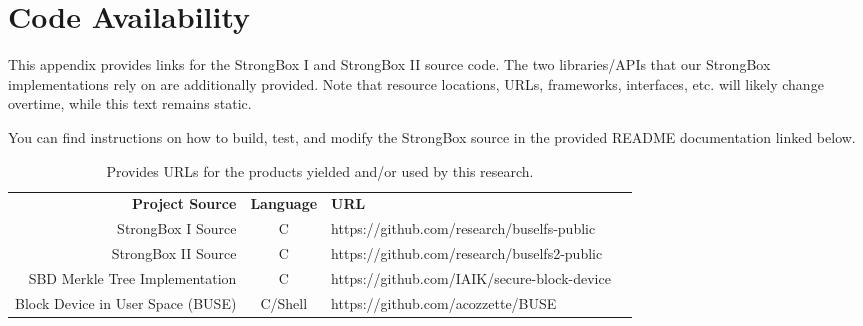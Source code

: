 \renewcommand\thechapter{A}
\chapter{Code Availability} \label{app:availability}

This appendix provides links for the StrongBox I and StrongBox II source code.
The two libraries/APIs that our StrongBox implementations rely on are
additionally provided. Note that resource locations, URLs, frameworks,
interfaces, etc. will likely change overtime, while this text remains static.

You can find instructions on how to build, test, and modify the StrongBox source
in the provided README documentation linked below.

\begin{table}
    \centering
    \caption{Provides URLs for the products yielded and/or used by this research.}
    \begin{tabular}{|r|c|l|l}
        \cline{1-3}
        \textbf{Project Source} & \textbf{Language} & \textbf{URL} & \\
        \cline{1-3}
        StrongBox I Source & C & https://github.com/research/buselfs-public & \\
        StrongBox II Source & C & https://github.com/research/buselfs2-public & \\
        SBD Merkle Tree Implementation & C & https://github.com/IAIK/secure-block-device & \\
        Block Device in User Space (BUSE) & C/Shell & https://github.com/acozzette/BUSE & \\
        \cline{1-3}
    \end{tabular}
\end{table}

